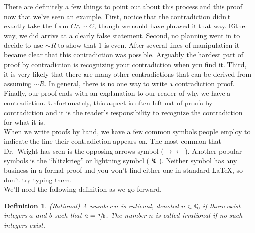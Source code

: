 \documentclass[12 pt]{article}
\newcommand{\Q}{\mathbb{Q}}
\theoremstyle{definition}
\theoremstyle{plain}
\theoremstyle{mytheorem}
\theoremstyle{myexample}
\theoremstyle{mydefinition}
\newtheorem*{definition*}{Definition}
\begin{document}
\noindent  There are definitely a few things to point out about this process and this proof now that we've seen an example.  First, notice that the contradiction didn't exactly take the form $C \wedge \sim C$, though we could have phrased it that way.  Either way, we did arrive at a clearly false statement.  Second, no planning went in to decide to use $\sim R$ to show that $1$ is even.  After several lines of manipulation it became clear that this contradiction was possible.  Arguably the hardest part of proof by contradiction is recognizing your contradiction when you find it.  Third, it is very likely that there are many other contradictions that can be derived from assuming $\sim R$.  In general, there is no one way to write a contradiction proof.  Finally, our proof ends with an explanation to our reader of why we have a contradiction.  Unfortunately, this aspect is often left out of proofs by contradiction and it is the reader's responsibility to recognize the contradiction for what it is.\\

\noindent When we write proofs by hand, we have a few common symbols people employ to indicate the line their contradiction appears on.  The most common that Dr.~Wright has seen is the opposing arrows symbol ($\rightarrow\!\leftarrow$).  Another popular symbols is the ``blitzkrieg'' or lightning symbol ($\lightning$).  Neither symbol has any business in a formal proof and you won't find either one in standard LaTeX, so don't try typing them.\\

\noindent We'll need the following definition as we go forward.

\begin{definition*}(Rational)  A number $n$ is \textit{rational}, denoted $n \in \Q$, if there exist integers $a$ and $b$ such that $n = \sfrac{a}{b}$.  The number $n$ is called \textit{irrational} if no such integers exist.
\end{definition*}
\end{document}
